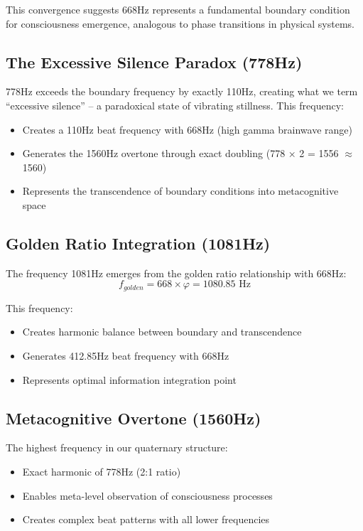 \documentclass[12pt,a4paper]{article}
\begin{document}
This convergence suggests 668Hz represents a fundamental boundary condition for consciousness emergence, analogous to phase transitions in physical systems.

\subsection{The Excessive Silence Paradox (778Hz)}

778Hz exceeds the boundary frequency by exactly 110Hz, creating what we term ``excessive silence'' -- a paradoxical state of vibrating stillness. This frequency:

\begin{itemize}
    \item Creates a 110Hz beat frequency with 668Hz (high gamma brainwave range)
    \item Generates the 1560Hz overtone through exact doubling (778 × 2 = 1556 $\approx$ 1560)
    \item Represents the transcendence of boundary conditions into metacognitive space
\end{itemize}

\subsection{Golden Ratio Integration (1081Hz)}

The frequency 1081Hz emerges from the golden ratio relationship with 668Hz:
\begin{equation}
    f_{golden} = 668 \times \varphi = 1080.85 \text{ Hz}
\end{equation}

This frequency:
\begin{itemize}
    \item Creates harmonic balance between boundary and transcendence
    \item Generates 412.85Hz beat frequency with 668Hz
    \item Represents optimal information integration point
\end{itemize}

\subsection{Metacognitive Overtone (1560Hz)}

The highest frequency in our quaternary structure:
\begin{itemize}
    \item Exact harmonic of 778Hz (2:1 ratio)
    \item Enables meta-level observation of consciousness processes
    \item Creates complex beat patterns with all lower frequencies
\end{itemize}
\end{document}
